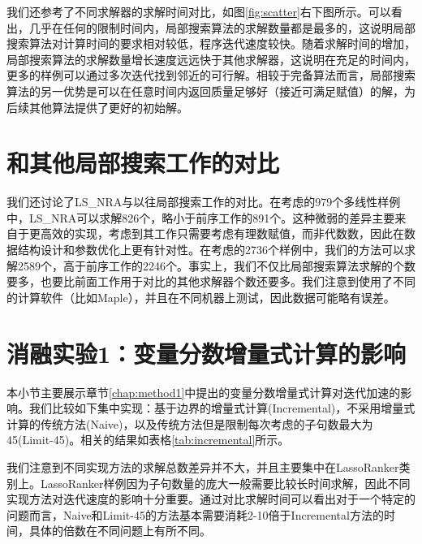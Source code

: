我们还参考了不同求解器的求解时间对比，如图\ref{fig:scatter}右下图所示。可以看出，几乎在任何的限制时间内，局部搜索算法的求解数量都是最多的，这说明局部搜索算法对计算时间的要求相对较低，程序迭代速度较快。随着求解时间的增加，局部搜索算法的求解数量增长速度远远快于其他求解器，这说明在充足的时间内，更多的样例可以通过多次迭代找到邻近的可行解。相较于完备算法而言，局部搜索算法的另一优势是可以在任意时间内返回质量足够好（接近可满足赋值）的解，为后续其他算法提供了更好的初始解。



\section{和其他局部搜索工作的对比}
我们还讨论了LS\_NRA与以往局部搜索工作的对比。在\cite{multilinear}考虑的979个多线性样例中，LS\_NRA可以求解826个，略小于前序工作的891个。这种微弱的差异主要来自于\cite{multilinear}更高效的实现，考虑到其工作只需要考虑有理数赋值，而非代数数，因此在数据结构设计和参数优化上更有针对性。在\cite{LiXZ23}考虑的2736个样例中，我们的方法可以求解2589个，高于前序工作的2246个。事实上，我们不仅比局部搜索算法求解的个数要多，也要比前面工作用于对比的其他求解器个数还要多。我们注意到\cite{LiXZ23}使用了不同的计算软件（比如Maple），并且在不同机器上测试，因此数据可能略有误差。


\section{消融实验1：变量分数增量式计算的影响}
本小节主要展示章节\ref{chap:method1}中提出的变量分数增量式计算对迭代加速的影响。我们比较如下集中实现：基于边界的增量式计算(Incremental)，不采用增量式计算的传统方法(Naive)，以及传统方法但是限制每次考虑的子句数最大为45(Limit-45)。相关的结果如表格\ref{tab:incremental}所示。

我们注意到不同实现方法的求解总数差异并不大，并且主要集中在LassoRanker类别上。LassoRanker样例因为子句数量的庞大一般需要比较长时间求解，因此不同实现方法对迭代速度的影响十分重要。通过对比求解时间可以看出对于一个特定的问题而言，Naive和Limit-45的方法基本需要消耗2-10倍于Incremental方法的时间，具体的倍数在不同问题上有所不同。

